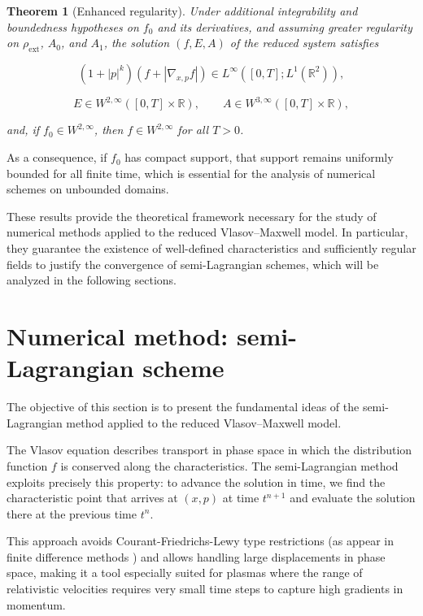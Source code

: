 \documentclass[11pt,a4paper,twoside,pdf]{article}
\numberwithin{equation}{section}
\newtheorem{theorem}{Theorem}[section]
\begin{document}
\begin{theorem}[Enhanced regularity]
Under additional integrability and boundedness hypotheses on $f_0$ and its derivatives, and assuming greater regularity on $\rho_{\mathrm{ext}}$, $A_0$, and $A_1$, the solution $(f,E,A)$ of the reduced system satisfies


\[
(1+|p|^k)(f + |\nabla_{x,p} f|) \in L^\infty([0,T];L^1(\mathbb{R}^2)),
\]




\[
E\in W^{2,\infty}([0,T]\times\mathbb{R}), \qquad
A\in W^{3,\infty}([0,T]\times\mathbb{R}),
\]


and, if $f_0\in W^{2,\infty}$, then $f\in W^{2,\infty}$ for all $T>0$.
\end{theorem}

As a consequence, if $f_0$ has compact support, that support remains uniformly bounded for all finite time, which is essential for the analysis of numerical schemes on unbounded domains.

\medskip

These results provide the theoretical framework necessary for the study of numerical methods applied to the reduced Vlasov--Maxwell model. In particular, they guarantee the existence of well-defined characteristics and sufficiently regular fields to justify the convergence of semi-Lagrangian schemes, which will be analyzed in the following sections.





\section{Numerical method: semi-Lagrangian scheme}

The objective of this section is to present the fundamental ideas of the semi-Lagrangian method applied to the reduced Vlasov--Maxwell model.



The Vlasov equation describes transport in phase space in which the distribution function $f$ is conserved along the characteristics. The semi-Lagrangian method exploits precisely this property: to advance the solution in time, we find the characteristic point that arrives at $(x,p)$ at time $t^{n+1}$ and evaluate the solution there at the previous time $t^n$.

This approach avoids Courant-Friedrichs-Lewy type restrictions (as appear in finite difference methods \cite{dymer2025stable}) and allows handling large displacements in phase space, making it a tool especially suited for plasmas where the range of relativistic velocities requires very small time steps to capture high gradients in momentum.
\end{document}
